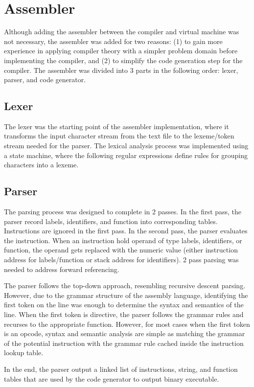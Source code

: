 \documentclass[manuscript,screen,nonacm]{acmart}
\begin{document}
\section{Assembler}
Although adding the assembler between the compiler and virtual machine was not necessary, the assembler was added for two reasons: (1) to gain more experience in applying compiler theory with a simpler problem domain before implementing the compiler, and (2) to simplify the code generation step for the compiler. The assembler was divided into 3 parts in the following order: lexer, parser, and code generator.

\subsection{Lexer}
The lexer was the starting point of the assembler implementation, where it transforms the input character stream from the text file to the lexeme/token stream needed for the parser. The lexical analysis process was implemented using a state machine, where the following regular expressions define rules for grouping characters into a lexeme.

\subsection{Parser}
The parsing process was designed to complete in 2 passes. In the first pass, the parser record labels, identifiers, and function into corresponding tables. Instructions are ignored in the first pass. In the second pass, the parser evaluates the instruction. When an instruction hold operand of type labels, identifiers, or function, the operand gets replaced with the numeric value (either instruction address for labels/function or stack address for identifiers). 2 pass parsing was needed to address forward referencing.

The parser follows the top-down approach, resembling recursive descent parsing. However, due to the grammar structure of the assembly language, identifying the first token on the line was enough to determine the syntax and semantics of the line. When the first token is directive, the parser follows the grammar rules and recurses to the appropriate function. However, for most cases when the first token is an opcode, syntax and semantic analysis are simple as matching the grammar of the potential instruction with the grammar rule cached inside the instruction lookup table.

In the end, the parser output a linked list of instructions, string, and function tables that are used by the code generator to output binary executable.
\end{document}
